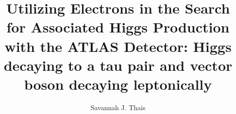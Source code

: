 \title{Utilizing Electrons in the Search for Associated Higgs Production with the ATLAS Detector: Higgs decaying to a tau pair and vector boson decaying leptonically}
\author{Savannah J. Thais}




